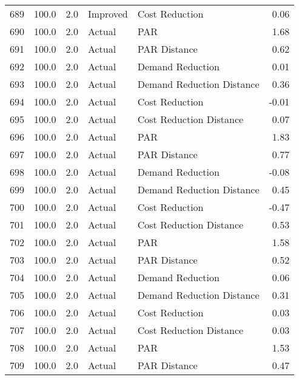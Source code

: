 \begin{longtable}{lrrllr}
689  &        100.0 &     2.0 &       Improved &             Cost Reduction &   0.06 \\
690  &        100.0 &     2.0 &         Actual &                        PAR &   1.68 \\
691  &        100.0 &     2.0 &         Actual &               PAR Distance &   0.62 \\
692  &        100.0 &     2.0 &         Actual &           Demand Reduction &   0.01 \\
693  &        100.0 &     2.0 &         Actual &  Demand Reduction Distance &   0.36 \\
694  &        100.0 &     2.0 &         Actual &             Cost Reduction &  -0.01 \\
695  &        100.0 &     2.0 &         Actual &    Cost Reduction Distance &   0.07 \\
696  &        100.0 &     2.0 &         Actual &                        PAR &   1.83 \\
697  &        100.0 &     2.0 &         Actual &               PAR Distance &   0.77 \\
698  &        100.0 &     2.0 &         Actual &           Demand Reduction &  -0.08 \\
699  &        100.0 &     2.0 &         Actual &  Demand Reduction Distance &   0.45 \\
700  &        100.0 &     2.0 &         Actual &             Cost Reduction &  -0.47 \\
701  &        100.0 &     2.0 &         Actual &    Cost Reduction Distance &   0.53 \\
702  &        100.0 &     2.0 &         Actual &                        PAR &   1.58 \\
703  &        100.0 &     2.0 &         Actual &               PAR Distance &   0.52 \\
704  &        100.0 &     2.0 &         Actual &           Demand Reduction &   0.06 \\
705  &        100.0 &     2.0 &         Actual &  Demand Reduction Distance &   0.31 \\
706  &        100.0 &     2.0 &         Actual &             Cost Reduction &   0.03 \\
707  &        100.0 &     2.0 &         Actual &    Cost Reduction Distance &   0.03 \\
708  &        100.0 &     2.0 &         Actual &                        PAR &   1.53 \\
709  &        100.0 &     2.0 &         Actual &               PAR Distance &   0.47 \\

\end{longtable}
